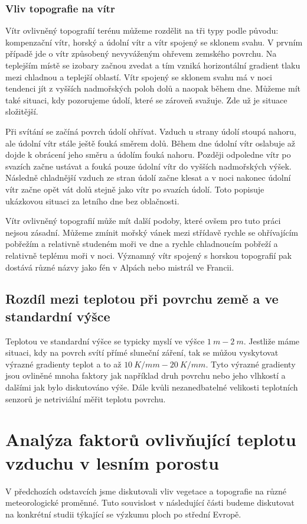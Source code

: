 \subsubsection{Vliv topografie na vítr}
Vítr ovlivněný topografií terénu můžeme rozdělit na tři typy podle původu: kompenzační vítr, horský a údolní vítr a vítr spojený se sklonem svahu. V prvním případě jde o vítr způsobený nevyváženým ohřevem zemského povrchu. Na teplejším místě se izobary začnou zvedat a tím vzniká horizontální gradient tlaku mezi chladnou a teplejší oblastí. Vítr spojený se sklonem svahu má v noci tendenci jít z vyšších nadmořských poloh dolů a naopak během dne. Můžeme mít také situaci, kdy pozorujeme údolí, které se zároveň svažuje. Zde už je situace složitější.

Při svítání se začíná povrch údolí ohřívat. Vzduch u strany údolí stoupá nahoru, ale údolní vítr stále ještě fouká směrem dolů. Během dne údolní vítr oslabuje až dojde k obrácení jeho směru a údolím fouká nahoru. Později odpoledne vítr po svazích začne ustávat a fouká pouze údolní vítr do vyšších nadmořských výšek. Následně chladnější vzduch ze stran údolí začne klesat a v noci nakonec údolní vítr začne opět vát dolů stejně jako vítr po svazích údolí. Toto popisuje ukázkovou situaci za letního dne bez oblačnosti.

Vítr ovlivněný topografií může mít další podoby, které ovšem pro tuto práci nejsou zásadní. Můžeme zmínit mořský vánek mezi střídavě rychle se ohřívajícím pobřežím a relativně studeném moři ve dne a rychle chladnoucím pobřeží a relativně teplému moři v noci. Významný vítr spojený s horskou topografií pak dostává různé názvy jako fén v Alpách nebo mistrál ve Francii\cite{alma}.

\subsection{Rozdíl mezi teplotou při povrchu země a ve standardní výšce}
Teplotou ve standardní výšce se typicky myslí ve výšce $\SI{1}{m}-\SI{2}{m}$. Jestliže máme situaci, kdy na povrch svítí přímé sluneční záření, tak se můžou vyskytovat výrazné gradienty teplot a to až $\SI{10}{K/mm}-\SI{20}{K/mm}$. Tyto výrazné gradienty jsou ovliněné mnoha faktory jak například druh povrchu nebo jeho vlhkostí a dalšími jak bylo diskutováno výše. Dále kvůli nezanedbatelné velikosti teplotních senzorů je netriviální měřit teplotu povrchu\cite{arya2001}. 

\section{Analýza faktorů ovlivňující teplotu vzduchu v lesním porostu}
V předchozích odstavcích jsme diskutovali vliv vegetace a topografie na různé meteorologické proměnné. Tuto souvislost v následující části budeme diskutovat na konkrétní studii týkající se výzkumu ploch po střední Evropě.

